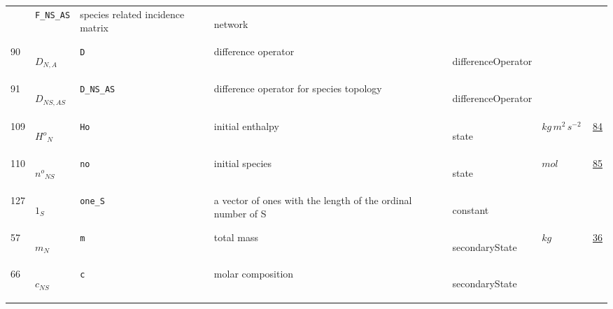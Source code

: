\begin{longtable}{|p{1cm}|p{2.5cm}|p{4.5cm}|p{8cm}|p{3.0cm}|p{3cm}|p{1cm}|}
             & \verb|F_NS_AS|
             & species related incidence matrix
             & \begin{lay}network \end{lay}
             & $  $
             & \\
    90
             & \hypertarget{"v:90"}{ $ {D}{_{N, A}} $}
             & \verb|D|
             & difference operator
             & \begin{lay}differenceOperator \end{lay}
             & $  $
             & \\
    91
             & \hypertarget{"v:91"}{ $ {D}{_{{N S}, {A S}}} $}
             & \verb|D_NS_AS|
             & difference operator for species topology
             & \begin{lay}differenceOperator \end{lay}
             & $  $
             & \\
    109
             & \hypertarget{"v:109"}{ $ {{H^o}}{_{N}} $}
             & \verb|Ho|
             & initial enthalpy
             & \begin{lay}state \end{lay}
             & $ kg \,m^{2} \,s^{-2} \, $
             & \hyperlink{"e:84"}{ 84 }
                 \\
    110
             & \hypertarget{"v:110"}{ $ {{n^o}}{_{{N S}}} $}
             & \verb|no|
             & initial species
             & \begin{lay}state \end{lay}
             & $ mol \, $
             & \hyperlink{"e:85"}{ 85 }
                 \\
    127
             & \hypertarget{"v:127"}{ $ {{1}}{_{S}} $}
             & \verb|one_S|
             & a vector of ones with the length of the ordinal number of S
             & \begin{lay}constant \end{lay}
             & $  $
             & \\
    57
             & \hypertarget{"v:57"}{ $ {m}{_{N}} $}
             & \verb|m|
             & total mass
             & \begin{lay}secondaryState \end{lay}
             & $ kg \, $
             & \hyperlink{"e:36"}{ 36 }
                 \\
    66
             & \hypertarget{"v:66"}{ $ {c}{_{{N S}}} $}
             & \verb|c|
             & molar composition
             & \begin{lay}secondaryState \end{lay}

\end{longtable}
